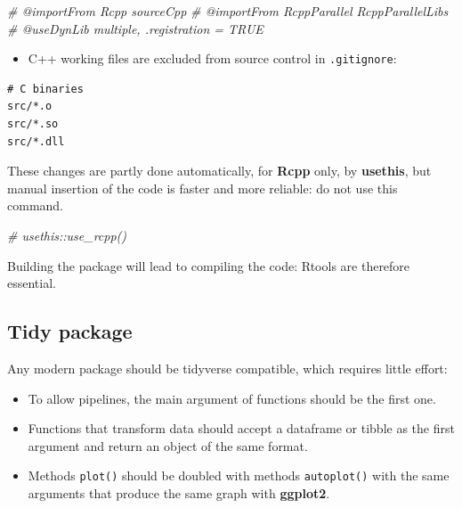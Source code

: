\documentclass[
  12pt,
  american,
  a4paper,
  extrafontsizes,onecolumn,openright
  ]{memoir}
\newenvironment{Shaded}{\begin{snugshade}}{\end{snugshade}}
\newcommand{\CommentTok}[1]{\textcolor[rgb]{0.56,0.35,0.01}{\textit{#1}}}
\providecommand{\tightlist}{%
  \setlength{\itemsep}{0pt}\setlength{\parskip}{0pt}}
\begin{document}
\scriptsize

\begin{Shaded}
\begin{Highlighting}[]
\CommentTok{\#\textquotesingle{} @importFrom Rcpp sourceCpp}
\CommentTok{\#\textquotesingle{} @importFrom RcppParallel RcppParallelLibs}
\CommentTok{\#\textquotesingle{} @useDynLib multiple, .registration = TRUE}
\end{Highlighting}
\end{Shaded}

\normalsize

\begin{itemize}
\tightlist
\item
  C++ working files are excluded from source control in \texttt{.gitignore}:
\end{itemize}

\begin{verbatim}
# C binaries
src/*.o
src/*.so
src/*.dll
\end{verbatim}

These changes are partly done automatically, for \textbf{Rcpp} only, by \textbf{usethis}, but manual insertion of the code is faster and more reliable: do not use this command.

\scriptsize

\begin{Shaded}
\begin{Highlighting}[]
\CommentTok{\# usethis::use\_rcpp()}
\end{Highlighting}
\end{Shaded}

\normalsize

Building the package will lead to compiling the code: Rtools are therefore essential.

\subsection{Tidy package}\label{tidy-package}

Any modern package should be tidyverse compatible, which requires little effort:

\begin{itemize}
\tightlist
\item
  To allow pipelines, the main argument of functions should be the first one.
\item
  Functions that transform data should accept a dataframe or tibble as the first argument and return an object of the same format.
\item
  Methods \texttt{plot()} should be doubled with methods \texttt{autoplot()} with the same arguments that produce the same graph with \textbf{ggplot2}.
\end{itemize}
\end{document}
